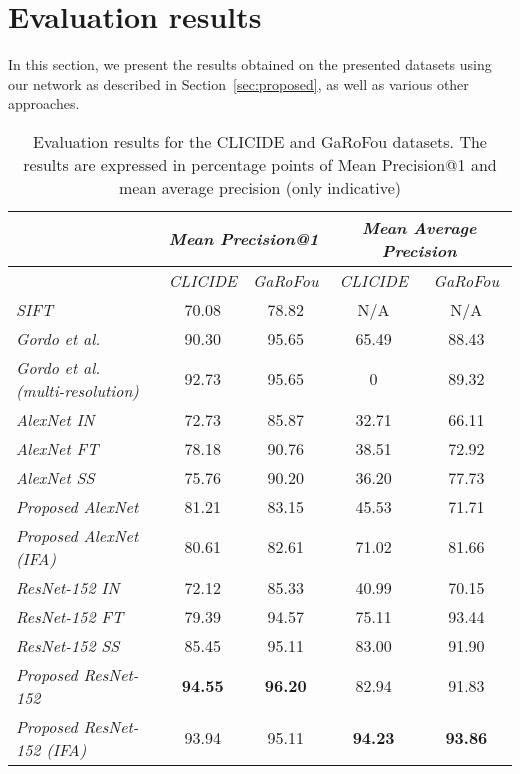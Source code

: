 \section{Evaluation results}\label{sec:evalresults}
In this section, we present the results obtained on the presented datasets
using our network as described in Section~\ref{sec:proposed}, as well
as various other approaches.

\begin{table}
\begin{tabular}{|l|c|c||c|c|}
\hline & \multicolumn{2}{c||}{\emph{Mean Precision@1}} &
\multicolumn{2}{c|}{\emph{Mean Average Precision}}\\
\hline & \emph{CLICIDE} & \emph{GaRoFou} & \emph{CLICIDE} & \emph{GaRoFou}\\
\hline \emph{SIFT} & 70.08 & 78.82 & N/A & N/A\\
\hline \emph{Gordo et al.~\cite{gordo_deep_2016}}
& 90.30 & 95.65 & 65.49 & 88.43\\
\hline \emph{Gordo et al.~\cite{gordo_deep_2016} (multi-resolution)}
& 92.73 & 95.65 & 0 & 89.32\\
\hline \emph{AlexNet IN} & 72.73 & 85.87 & 32.71 & 66.11\\
\hline \emph{AlexNet FT} & 78.18 & 90.76 & 38.51 & 72.92\\
\hline \emph{AlexNet SS} & 75.76 & 90.20 & 36.20 & 77.73\\
\hline \emph{Proposed AlexNet} & 81.21 & 83.15 & 45.53 & 71.71\\
\hline \emph{Proposed AlexNet (IFA)} & 80.61 & 82.61 & 71.02 & 81.66\\
\hline \emph{ResNet-152 IN} & 72.12 & 85.33 & 40.99 & 70.15\\
\hline \emph{ResNet-152 FT} & 79.39 & 94.57 & 75.11 & 93.44\\
\hline \emph{ResNet-152 SS} & 85.45 & 95.11 & 83.00 & 91.90\\
\hline \emph{Proposed ResNet-152} & \textbf{94.55} & \textbf{96.20}
& 82.94 & 91.83\\
\hline \emph{Proposed ResNet-152 (IFA)} & 93.94 & 95.11
& \textbf{94.23} & \textbf{93.86}\\
\hline
\end{tabular}
\caption{Evaluation results for the CLICIDE and GaRoFou datasets.
The results are expressed in percentage points of
Mean Precision@1 and mean average precision (only indicative)
\label{tab:results}}
\end{table}

